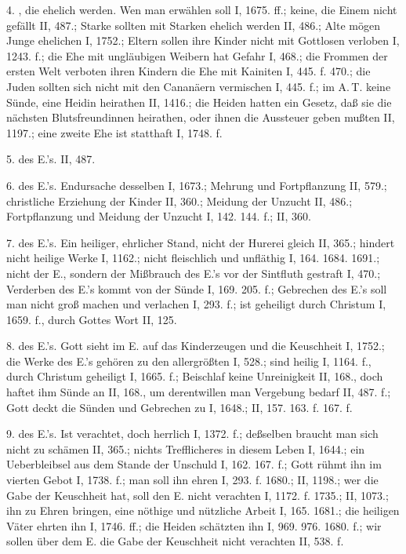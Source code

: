 4. , die ehelich werden. Wen man erwählen soll I, 1675. ff.; keine, die Einem nicht gefällt II, 487.; Starke sollten mit Starken ehelich werden II, 486.; Alte mögen Junge ehelichen I, 1752.; Eltern sollen ihre Kinder nicht mit Gottlosen verloben I, 1243. f.; die Ehe mit ungläubigen Weibern hat Gefahr I, 468.; die Frommen der ersten Welt verboten ihren Kindern die Ehe mit Kainiten I, 445. f. 470.; die Juden sollten sich nicht mit den Cananäern vermischen I, 445. f.; im A.\,T. keine Sünde, eine Heidin heirathen II, 1416.; die Heiden hatten ein Gesetz, daß sie die nächsten Blutsfreundinnen heirathen, oder ihnen die Aussteuer geben mußten II, 1197.; eine zweite Ehe ist statthaft I, 1748. f.

5.  des E.’s. II, 487.

6.  des E.’s. Endursache desselben I, 1673.; Mehrung und Fortpflanzung II, 579.; christliche Erziehung der Kinder II, 360.; Meidung der Unzucht II, 486.; Fortpflanzung und Meidung der Unzucht I, 142. 144. f.; II, 360.

7.  des E.’s. Ein heiliger, ehrlicher Stand, nicht der Hurerei gleich II, 365.; hindert nicht heilige Werke I, 1162.; nicht fleischlich und unfläthig I, 164. 1684. 1691.; nicht der E., sondern der Mißbrauch des E.’s vor der Sintfluth gestraft I, 470.; Verderben des E.’s kommt von der Sünde I, 169. 205. f.; Gebrechen des E.’s soll man nicht groß machen und verlachen I, 293. f.; ist geheiligt durch Christum I, 1659. f., durch Gottes Wort II, 125.

8.  des E.’s. Gott sieht im E. auf das Kinderzeugen und die Keuschheit I, 1752.; die Werke des E.’s gehören zu den allergrößten I, 528.; sind heilig I, 1164. f., durch Christum geheiligt I, 1665. f.; Beischlaf keine Unreinigkeit II, 168., doch haftet ihm Sünde an II, 168., um derentwillen man Vergebung bedarf II, 487. f.;
Gott deckt die Sünden und Gebrechen zu I, 1648.; II, 157. 163. f. 167. f.

9.  des E.’s. Ist verachtet, doch herrlich I, 1372. f.; deßselben braucht man sich nicht zu schämen II, 365.; nichts Trefflicheres in diesem Leben I, 1644.; ein Ueberbleibsel aus dem Stande der Unschuld I, 162. 167. f.; Gott rühmt ihn im vierten Gebot I, 1738. f.; man soll ihn ehren I, 293. f. 1680.; II, 1198.; wer die Gabe der Keuschheit hat, soll den E. nicht verachten I, 1172. f. 1735.; II, 1073.; ihn zu Ehren bringen, eine nöthige und nützliche Arbeit I, 165. 1681.; die heiligen Väter ehrten ihn I, 1746. ff.; die Heiden schätzten ihn I, 969. 976. 1680. f.; wir sollen über dem E. die Gabe der Keuschheit nicht verachten II, 538. f.

